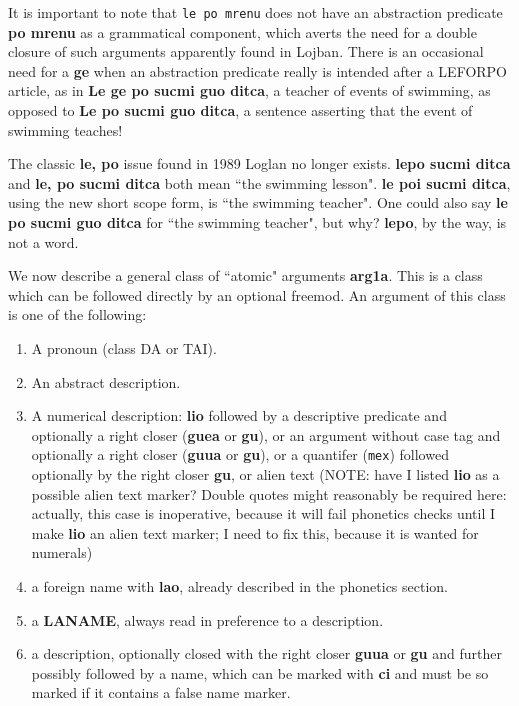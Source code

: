 \documentclass[12pt]{book}
\begin{document}
{It is important to note that {\tt le po mrenu} does not have an abstraction predicate {\bf po mrenu} as a grammatical component, which averts the need for a double closure of such arguments apparently found in Lojban.  There is an occasional need for a {\bf ge} when an abstraction predicate really is intended after a LEFORPO article, as in
{\bf Le ge po sucmi guo ditca}, a teacher of events of swimming, as opposed to {\bf Le po sucmi guo ditca}, a sentence asserting that the event of swimming teaches!

The classic {\bf le, po} issue found in 1989 Loglan no longer exists.  {\bf lepo sucmi ditca} and {\bf le, po sucmi ditca} both mean ``the swimming lesson".  {\bf le poi sucmi ditca}, using the new short scope form, is ``the swimming teacher".  One could also say {\bf le po sucmi guo ditca} for ``the swimming teacher", but why?   {\bf lepo}, by the way, is not a word.

We now describe a general class of ``atomic" arguments {\bf arg1a}.  This is a class which can be followed directly by an optional freemod.  An argument of this class is one of the following:

\begin{enumerate}

\item A pronoun (class DA or TAI).

\item An abstract description.

\item A numerical description:  {\bf lio} followed by a descriptive predicate and optionally a right closer ({\bf guea} or {\bf gu}), or an argument without case tag and optionally a right closer ({\bf guua} or {\bf gu}), or a quantifer ({\tt mex}) followed optionally by the right closer {\bf gu}, or alien text (NOTE:  have I listed {\bf lio} as a possible alien text marker?  Double quotes might reasonably be required here:  actually, this case is inoperative, because it will fail phonetics checks until I make {\bf lio} an alien text marker; I need to fix this, because it is wanted for numerals)

\item a foreign name with {\bf lao}, already described in the phonetics section.

\item a {\bf LANAME}, always read in preference to a description.

\item a description, optionally closed with  the right closer {\bf guua} or {\bf gu} and further possibly followed by a name, which can be marked with {\bf ci} and must be so marked if it contains a false name marker.


\end{enumerate}}
\end{document}
